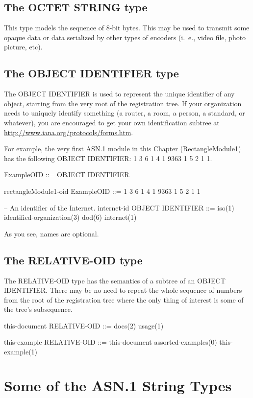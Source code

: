 \documentclass[english,oneside,12pt]{book}
\begin{document}
\subsection{The OCTET STRING type}

This type models the sequence of 8-bit bytes. This may be used to
transmit some opaque data or data serialized by other types of encoders
(i.~e., video file, photo picture, etc).

\subsection{The OBJECT IDENTIFIER type}

The OBJECT IDENTIFIER is used to represent the unique identifier of
any object, starting from the very root of the registration tree.
If your organization needs to uniquely identify something (a router,
a room, a person, a standard, or whatever), you are encouraged to
get your own identification subtree at \url{http://www.iana.org/protocols/forms.htm}.

For example, the very first ASN.1 module in this Chapter (RectangleModule1)
has the following OBJECT IDENTIFIER: 1 3 6 1 4 1 9363 1 5 2 1 1.
\begin{asn}
ExampleOID ::= OBJECT IDENTIFIER

rectangleModule1-oid ExampleOID
  ::= { 1 3 6 1 4 1 9363 1 5 2 1 1 }

-- An identifier of the Internet.
internet-id OBJECT IDENTIFIER
  ::= { iso(1) identified-organization(3)
        dod(6) internet(1) }
\end{asn}
As you see, names are optional.


\subsection{The RELATIVE-OID type}

The RELATIVE-OID type has the semantics of a subtree of an OBJECT
IDENTIFIER. There may be no need to repeat the whole sequence of numbers
from the root of the registration tree where the only thing of interest
is some of the tree's subsequence.
\begin{asn}
this-document RELATIVE-OID ::= { docs(2) usage(1) }

this-example RELATIVE-OID ::= {
    this-document assorted-examples(0) this-example(1) }
\end{asn}

\section{Some of the ASN.1 String Types}
\end{document}
